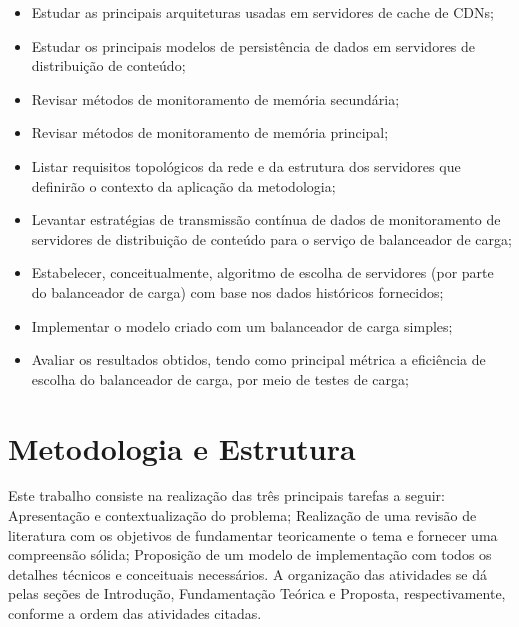 \begin{itemize}
    \item Estudar as principais arquiteturas usadas em servidores de cache de CDNs;
    \item Estudar os principais modelos de persistência de dados em servidores de distribuição de conteúdo;
    \item Revisar métodos de monitoramento de memória secundária;
    \item Revisar métodos de monitoramento de memória principal;
    \item Listar requisitos topológicos da rede e da estrutura dos servidores que definirão o contexto da aplicação da metodologia;
    \item Levantar estratégias de transmissão contínua de dados de monitoramento de servidores de distribuição de conteúdo para o serviço de balanceador de carga;
    \item Estabelecer, conceitualmente, algoritmo de escolha de servidores (por parte do balanceador de carga) com base nos dados históricos fornecidos;
    \item Implementar o modelo criado com um balanceador de carga simples;
    \item Avaliar os resultados obtidos, tendo como principal métrica a eficiência de escolha do balanceador de carga, por meio de testes de carga; 
\end{itemize}

\section{Metodologia e Estrutura}

Este trabalho consiste na realização das três principais tarefas a seguir: Apresentação e contextualização do problema; Realização de uma revisão de literatura com os objetivos de fundamentar teoricamente o tema e fornecer uma compreensão sólida; Proposição de um modelo de implementação com todos os detalhes técnicos e conceituais necessários. A organização das atividades se dá pelas seções de Introdução, Fundamentação Teórica e Proposta, respectivamente, conforme a ordem das atividades citadas.
